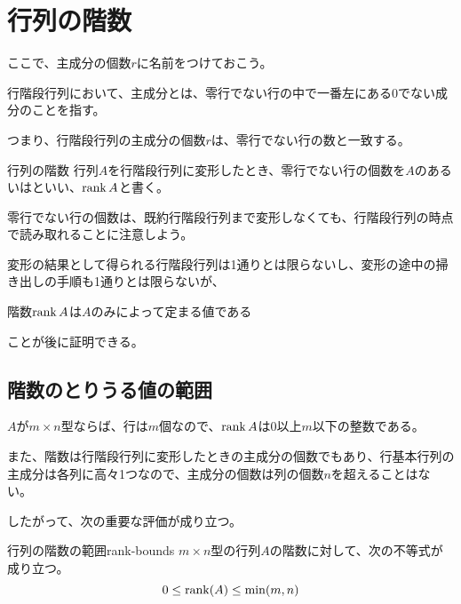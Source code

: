 \documentclass[../../../topic_linear-algebra]{subfiles}
\begin{document}
\sectionline
\section{行列の階数}

ここで、主成分の個数$r$に名前をつけておこう。

\br

行階段行列において、主成分とは、零行でない行の中で一番左にある0でない成分のことを指す。

つまり、行階段行列の主成分の個数$r$は、零行でない行の数と一致する。

\begin{definition}{行列の階数}
  行列$A$を行階段行列に変形したとき、零行でない行の個数を$A$のあるいはといい、$\rank A$と書く。
\end{definition}

零行でない行の個数は、既約行階段行列まで変形しなくても、行階段行列の時点で読み取れることに注意しよう。

\br

変形の結果として得られる行階段行列は1通りとは限らないし、変形の途中の掃き出しの手順も1通りとは限らないが、
\begin{emphabox}
  \begin{spacebox}
    \begin{center}
      階数$\rank A$は$A$のみによって定まる値である
    \end{center}
  \end{spacebox}
\end{emphabox}
ことが後に証明できる。

\subsection{階数のとりうる値の範囲}

$A$が$m \times n$型ならば、行は$m$個なので、$\rank A$は0以上$m$以下の整数である。

\br

また、階数は行階段行列に変形したときの主成分の個数でもあり、行基本行列の主成分は各列に高々1つなので、主成分の個数は列の個数$n$を超えることはない。

\br

したがって、次の重要な評価が成り立つ。

\begin{theorem}{行列の階数の範囲}{rank-bounds}
  $m \times n$型の行列$A$の階数に対して、次の不等式が成り立つ。
  \begin{equation*}
    0 \leq \rank(A) \leq \min(m,n)
  \end{equation*}
\end{theorem}
\end{document}
